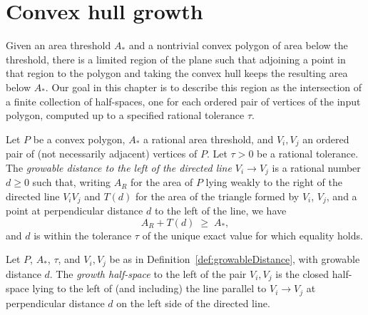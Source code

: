 


\section{Convex hull growth}

Given an area threshold $A_*$ and a nontrivial convex polygon of area below
the threshold, there is a limited region of the plane such that adjoining a
point in that region to the polygon and taking the convex hull keeps the
resulting area below $A_*$. Our goal in this chapter is to describe this
region as the intersection of a finite collection of half-spaces, one for
each ordered pair of vertices of the input polygon, computed up to a
specified rational tolerance $\tau$.

\begin{definition}
    \label{def:growableDistance}
    Let $P$ be a convex polygon, $A_*$ a rational area threshold, and
    $V_i, V_j$ an ordered pair of (not necessarily adjacent) vertices of
    $P$. Let $\tau > 0$ be a rational tolerance. The
    \emph{growable distance to the left of the directed line
    $V_i \to V_j$} is a rational number $d \ge 0$ such that, writing $A_R$
    for the area of $P$ lying weakly to the right of the directed line
    $V_i V_j$ and $T(d)$ for the area of the triangle formed by $V_i$,
    $V_j$, and a point at perpendicular distance $d$ to the left of the
    line, we have
    \[ A_R + T(d) \;\ge\; A_* , \]
    and $d$ is within the tolerance $\tau$ of the unique exact value for
    which equality holds.
\end{definition}

\begin{definition}
    \label{def:growthHalfspace}
    Let $P$, $A_*$, $\tau$, and $V_i, V_j$ be as in
    Definition~\ref{def:growableDistance}, with growable distance $d$.
    The \emph{growth half-space} to the left of the pair $V_i, V_j$ is
    the closed half-space lying to the left of (and including) the line
    parallel to $V_i \to V_j$ at perpendicular distance $d$ on the left
    side of the directed line.
\end{definition}

